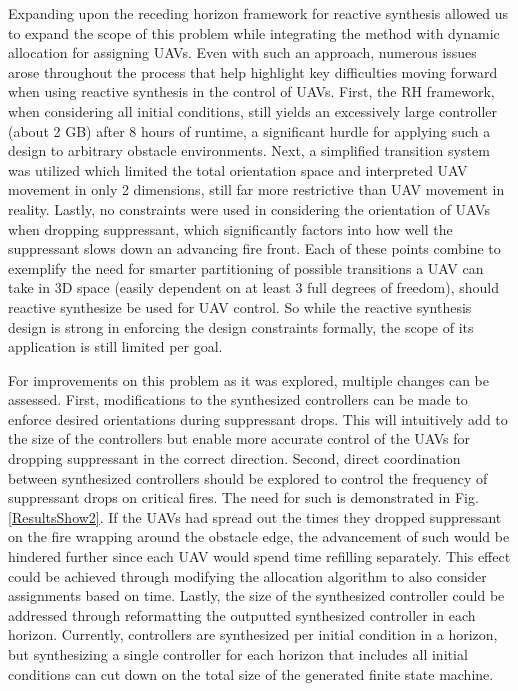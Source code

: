 \documentclass{ieeeaccess}
\begin{document}
Expanding upon the receding horizon framework for reactive synthesis allowed us to expand the scope of this problem while integrating the method with dynamic allocation for assigning UAVs. Even with such an approach, numerous issues arose throughout the process that help highlight key difficulties moving forward when using reactive synthesis in the control of UAVs. First, the RH framework, when considering all initial conditions, still yields an excessively large controller (about 2 GB) after 8 hours of runtime, a significant hurdle for applying such a design to arbitrary obstacle environments. Next, a simplified transition system was utilized which limited the total orientation space and interpreted UAV movement in only 2 dimensions, still far more restrictive than UAV movement in reality. Lastly, no constraints were used in considering the orientation of UAVs when dropping suppressant, which significantly factors into how well the suppressant slows down an advancing fire front. Each of these points combine to exemplify the need for smarter partitioning of possible transitions a UAV can take in 3D space (easily dependent on at least 3 full degrees of freedom), should reactive synthesize be used for UAV control. So while the reactive synthesis design is strong in enforcing the design constraints formally, the scope of its application is still limited per goal.

For improvements on this problem as it was explored, multiple changes can be assessed. First, modifications to the synthesized controllers can be made to enforce desired orientations during suppressant drops. This will intuitively add to the size of the controllers but enable more accurate control of the UAVs for dropping suppressant in the correct direction. Second, direct coordination between synthesized controllers should be explored to control the frequency of suppressant drops on critical fires. The need for such is demonstrated in Fig. \ref{ResultsShow2}. If the UAVs had spread out the times they dropped suppressant on the fire wrapping around the obstacle edge, the advancement of such would be hindered further since each UAV would spend time refilling separately. This effect could be achieved through modifying the allocation algorithm to also consider assignments based on time. Lastly, the size of the synthesized controller could be addressed through reformatting the outputted synthesized controller in each horizon. Currently, controllers are synthesized per initial condition in a horizon, but synthesizing a single controller for each horizon that includes all initial conditions can cut down on the total size of the generated finite state machine.
\end{document}
